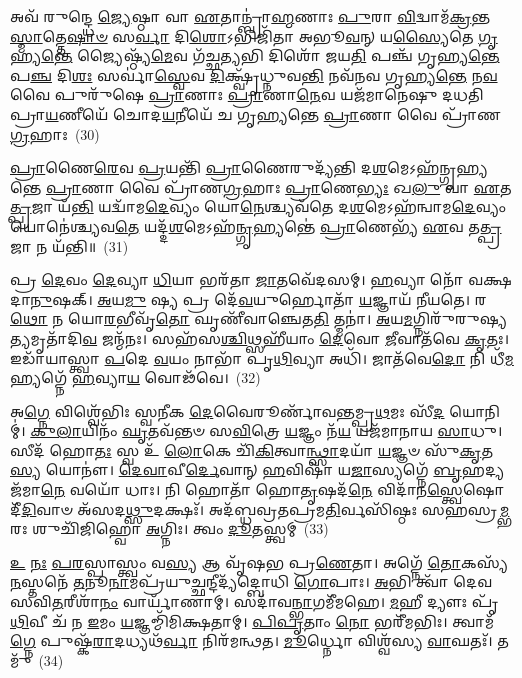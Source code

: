 𑌅𑌵᳴ 𑌰𑍁𑌨𑍍𑌦𑍍𑌧𑍇 \ul{𑌜𑍍𑌯𑍇}\-𑌷𑍍𑌠𑌾 𑌵𑌾 \ul{𑌏}\-𑌤𑌾𑌨𑍍𑌬𑍍𑌰𑌾॑\-\ul{𑌹𑍍𑌮}\-𑌣𑌾𑌃 \ul{𑌪𑍁}\-𑌰𑌾 \ul{𑌵𑌿}\-𑌦𑍍𑌵𑌾𑌮᳴\-\ul{𑌕𑍍𑌰}\-𑌨𑍍𑌤\-\ul{𑌸𑍍𑌮𑌾}\-𑌤𑍍𑌤𑍇\-\ul{𑌷𑌾}\-\-\ul{𑍞} 𑌸\-\ul{𑌰𑍍𑌵𑌾} 𑌦𑌿\-\ul{𑌶𑍋}\-\-𑌽𑌭𑌿𑌜𑌿᳴𑌤𑌾 𑌅𑌭𑍂\-\ul{𑌵}\-𑌨𑍍 𑌯\-\ul{𑌸𑍍𑌯𑍈}\-𑌤𑍇 \ul{𑌗𑍃}\-𑌹𑍍𑌯\-\ul{𑌨𑍍𑌤𑍇} 𑌜𑍍𑌯𑍈𑌷𑍍𑌠𑍍𑌯᳴\-\ul{𑌮𑍇}\-𑌵 𑌗᳴𑌚𑍍𑌛\-\ul{𑌤𑍍𑌯}\-𑌭𑌿 𑌦𑌿𑌶𑍋᳴ 𑌜𑌯\-\ul{𑌤𑌿} 𑌪𑌞𑍍𑌚᳴ 𑌗𑍃𑌹𑍍𑌯\-\ul{𑌨𑍍𑌤𑍇} 𑌪\-\ul{𑌞𑍍𑌚} 𑌦𑌿\-\ul{𑌶𑌃} 𑌸𑌰𑍍𑌵𑌾॑\-\ul{𑌸𑍍𑌵𑍇}\-𑌵 \ul{𑌦𑌿}\-𑌕𑍍𑌷𑍍𑌵𑍃᳴𑌧𑍍𑌨𑍁𑌵\-\ul{𑌨𑍍𑌤𑌿} 𑌨𑌵᳴𑌨𑌵 𑌗𑍃𑌹𑍍𑌯\-\ul{𑌨𑍍𑌤𑍇} 𑌨\-\ul{𑌵} 𑌵𑍈 𑌪𑍁𑌰𑍁᳴𑌷𑍇 \ul{𑌪𑍍𑌰𑌾}\-𑌣𑌾𑌃 \ul{𑌪𑍍𑌰𑌾}\-𑌣𑌾\-\ul{𑌨𑍇}\-𑌵 𑌯𑌜᳴𑌮𑌾𑌨𑍇𑌷𑍁 𑌦𑌧𑌤𑌿 𑌪𑍍𑌰𑌾\-\ul{𑌯}\-𑌣𑍀𑌯𑍇᳴ 𑌚𑍋𑌦\-\ul{𑌯}\-𑌨𑍀𑌯𑍇᳴ 𑌚 𑌗𑍃𑌹𑍍𑌯𑌨𑍍𑌤𑍇 \ul{𑌪𑍍𑌰𑌾}\-𑌣𑌾 𑌵𑍈 𑌪𑍍𑌰𑌾᳴𑌣\-\ul{𑌗𑍍𑌰}\-𑌹𑌾𑌃~(30)

\-\ul{𑌪𑍍𑌰𑌾}\-𑌣𑍈\-\ul{𑌰𑍇}\-𑌵 \ul{𑌪𑍍𑌰}\-𑌯𑌨𑍍𑌤𑌿᳴ \ul{𑌪𑍍𑌰𑌾}\-𑌣𑍈𑌰𑍁𑌦𑍍𑌯᳴𑌨𑍍𑌤𑌿 𑌦\-\ul{𑌶}\-𑌮𑍇\-𑌽𑌹᳴𑌨𑍍𑌗𑍃𑌹𑍍𑌯𑌨𑍍𑌤𑍇 \ul{𑌪𑍍𑌰𑌾}\-𑌣𑌾 𑌵𑍈 𑌪𑍍𑌰𑌾᳴𑌣\-\ul{𑌗𑍍𑌰}\-𑌹𑌾𑌃 \ul{𑌪𑍍𑌰𑌾}\-𑌣𑍇\-\ul{𑌭𑍍𑌯𑌃} 𑌖\-\ul{𑌲𑍁} 𑌵𑌾 \ul{𑌏}\-𑌤\-\ul{𑌤𑍍𑌪𑍍𑌰}\-𑌜𑌾 𑌯᳴\-\ul{𑌨𑍍𑌤𑌿} 𑌯𑌦𑍍𑌵𑌾᳴𑌮\-\ul{𑌦𑍇}\-𑌵𑍍𑌯𑌂 𑌯𑍋\-\ul{𑌨𑍇}\-𑌶𑍍𑌚𑍍𑌯𑌵᳴𑌤𑍇 𑌦\-\ul{𑌶}\-𑌮𑍇\-𑌽𑌹᳴𑌨𑍍𑌵𑌾𑌮\-\ul{𑌦𑍇}\-𑌵𑍍𑌯𑌂 𑌯𑍋𑌨𑍇॑𑌶𑍍𑌚𑍍𑌯𑌵\-\ul{𑌤𑍇} 𑌯𑌦𑍍𑌦᳴\-\ul{𑌶}\-𑌮𑍇\-𑌽𑌹᳴\-\ul{𑌨𑍍𑌗𑍃}\-𑌹𑍍𑌯𑌨𑍍𑌤𑍇॑ \ul{𑌪𑍍𑌰𑌾}\-𑌣𑍇𑌭𑍍𑌯᳴ \ul{𑌏}\-𑌵 𑌤\-\ul{𑌤𑍍𑌪𑍍𑌰}\-𑌜𑌾 𑌨 𑌯᳴𑌨𑍍𑌤𑌿॥~(31)

{\anuvakamend[{𑌤𑌤𑍍𑌪𑍍𑌰𑌾᳴𑌣\-\ul{𑌗𑍍𑌰}\-𑌹𑌾𑌃 \ul{𑌸}\-𑌪𑍍𑌤𑌤𑍍𑌰𑌿𑍞᳴𑌶𑌚𑍍𑌚}]}%

𑌪𑍍𑌰 \ul{𑌦𑍇}\-𑌵𑌂 \ul{𑌦𑍇}\-𑌵𑍍𑌯𑌾 \ul{𑌧𑌿}\-𑌯𑌾 𑌭𑌰᳴𑌤𑌾 \ul{𑌜𑌾}\-𑌤𑌵𑍇᳴𑌦𑌸𑌮𑍍। \ul{𑌹}\-𑌵𑍍𑌯𑌾 𑌨𑍋᳴ 𑌵𑌕𑍍𑌷𑌦𑌾\-\ul{𑌨𑍁}\-𑌷𑌕𑍍। \ul{𑌅}\-𑌯\-\ul{𑌮𑍁} 𑌷𑍍𑌯 𑌪𑍍𑌰 𑌦𑍇᳴\-\ul{𑌵}\-𑌯𑍁𑌰𑍍\mbox{}𑌹𑍋𑌤𑌾᳴ \ul{𑌯}\-𑌜𑍍𑌞𑌾𑌯᳴ 𑌨𑍀𑌯𑌤𑍇। 𑌰\-\ul{𑌥𑍋} 𑌨 𑌯𑍋\-\ul{𑌰}\-𑌭𑍀𑌵𑍃᳴\-\ul{𑌤𑍋} 𑌘𑍃𑌣𑍀᳴𑌵𑌾𑌞𑍍𑌚𑍇𑌤\-\ul{𑌤𑌿} 𑌤𑍍𑌮𑌨𑌾॑। \ul{𑌅}\-𑌯\-\ul{𑌮}\-𑌗𑍍𑌨𑌿𑌰𑍁᳴𑌰𑍁𑌷𑍍𑌯\-\ul{𑌤𑍍𑌯}\-𑌮𑍃𑌤𑌾᳴𑌦𑌿\-\ul{𑌵} 𑌜𑌨𑍍𑌮᳴𑌨𑌃। 𑌸𑌹᳴𑌸\-\ul{𑌶𑍍𑌚𑌿}\-𑌥𑍍𑌸𑌹𑍀᳴𑌯𑌾𑌂 \ul{𑌦𑍇}\-𑌵𑍋 \ul{𑌜𑍀}\-𑌵𑌾𑌤᳴𑌵𑍇 \ul{𑌕𑍃}\-𑌤𑌃। 𑌇𑌡𑌾᳴𑌯𑌾𑌸𑍍𑌤𑍍𑌵𑌾 \ul{𑌪}\-𑌦𑍇 \ul{𑌵}\-𑌯𑌂 𑌨𑌾𑌭𑌾᳴ 𑌪𑍃\-\ul{𑌥𑌿}\-𑌵𑍍𑌯𑌾 𑌅𑌧𑌿᳴। 𑌜𑌾𑌤᳴𑌵𑍇\-\ul{𑌦𑍋} 𑌨𑌿 𑌧𑍀᳴\-\ul{𑌮}\-𑌹𑍍𑌯𑌗𑍍𑌨𑍇᳴ \ul{𑌹}\-𑌵𑍍𑌯𑌾\-\ul{𑌯} 𑌵𑍋𑌢᳴𑌵𑍇।~(32)

𑌅\-\ul{𑌗𑍍𑌨𑍇} 𑌵𑌿𑌶𑍍𑌵𑍇᳴𑌭𑌿𑌃 𑌸𑍍𑌵𑌨𑍀𑌕 \ul{𑌦𑍇}\-𑌵𑍈𑌰𑍂𑌰𑍍𑌣𑌾᳴𑌵𑌨𑍍𑌤𑌮𑍍𑌪𑍍𑌰\-\ul{𑌥}\-𑌮𑌃 𑌸𑍀᳴\-\ul{𑌦} 𑌯𑍋𑌨𑌿𑌮𑍍॑। \ul{𑌕𑍁}\-\-\ul{𑌲𑌾}\-𑌯𑌿𑌨𑌂᳴ \ul{𑌘𑍃}\-𑌤𑌵᳴𑌨𑍍𑌤𑍞 𑌸\-\ul{𑌵𑌿}\-𑌤𑍍𑌰𑍇 \ul{𑌯}\-𑌜𑍍𑌞𑌂 𑌨᳴\-\ul{𑌯} 𑌯𑌜᳴𑌮𑌾𑌨𑌾𑌯 \ul{𑌸𑌾}\-𑌧𑍁। 𑌸𑍀𑌦᳴ 𑌹𑍋\-\ul{𑌤𑌃} 𑌸𑍍𑌵 𑌉᳴ \ul{𑌲𑍋}\-𑌕𑍇 𑌚𑌿᳴\-\ul{𑌕𑌿}\-𑌤𑍍𑌵𑌾\-\ul{𑌨𑍍𑌥𑍍𑌸𑌾}\-𑌦𑌯𑌾᳴ \ul{𑌯}\-𑌜𑍍𑌞𑍞 𑌸𑍁᳴\-\ul{𑌕𑍃}\-𑌤\-\ul{𑌸𑍍𑌯} 𑌯𑍋𑌨𑍗॑। \ul{𑌦𑍇}\-\-\ul{𑌵𑌾}\-𑌵𑍀\-\ul{𑌰𑍍𑌦𑍇}\-𑌵𑌾𑌨𑍍 \ul{𑌹}\-𑌵𑌿𑌷𑌾᳴ 𑌯\-\ul{𑌜𑌾}\-𑌸𑍍𑌯𑌗𑍍𑌨𑍇᳴ \ul{𑌬𑍃}\-𑌹𑌦𑍍𑌯𑌜᳴𑌮𑌾\-\ul{𑌨𑍇} 𑌵𑌯𑍋᳴ 𑌧𑌾𑌃। 𑌨𑌿 𑌹𑍋𑌤𑌾᳴ 𑌹𑍋\-\ul{𑌤𑍃}\-𑌷𑌦᳴\-\ul{𑌨𑍇} 𑌵𑌿𑌦𑌾᳴𑌨\-\ul{𑌸𑍍𑌤𑍍𑌵𑍇}\-𑌷𑍋 𑌦𑍀᳴\-\ul{𑌦𑌿}\-𑌵𑌾𑍞 𑌅᳴𑌸𑌦\-\ul{𑌥𑍍𑌸𑍁}\-𑌦𑌕𑍍𑌷𑌃᳴। 𑌅𑌦᳴𑌬𑍍𑌧𑌵𑍍𑌰𑌤𑌪𑍍𑌰𑌮\-\ul{𑌤𑌿}\-𑌰𑍍𑌵𑌸𑌿᳴𑌷𑍍𑌠𑌃 𑌸𑌹𑌸𑍍𑌰\-\ul{𑌮𑍍𑌭}\-𑌰𑌃 𑌶𑍁𑌚𑌿᳴𑌜𑌿𑌹𑍍𑌵𑍋 \ul{𑌅}\-𑌗𑍍𑌨𑌿𑌃। 𑌤𑍍𑌵𑌂 \ul{𑌦𑍂}\-𑌤𑌸𑍍𑌤𑍍𑌵𑌮𑍍~(33)

\-\ul{𑌉} \ul{𑌨𑌃} \ul{𑌪}\-\-\ul{𑌰}\-𑌸𑍍𑌪𑌾𑌸𑍍𑌤𑍍𑌵𑌂 𑌵\-\ul{𑌸𑍍𑌯} 𑌆 𑌵𑍃᳴𑌷𑌭 𑌪𑍍𑌰\-\ul{𑌣𑍇}\-𑌤𑌾। 𑌅𑌗𑍍𑌨𑍇᳴ \ul{𑌤𑍋}\-𑌕𑌸𑍍𑌯᳴ \ul{𑌨}\-𑌸𑍍𑌤𑌨𑍇᳴ \ul{𑌤}\-𑌨𑍂\-\ul{𑌨𑌾}\-𑌮𑌪𑍍𑌰᳴𑌯𑍁\-\ul{𑌚𑍍𑌛}\-𑌨𑍍𑌦𑍀𑌦𑍍𑌯᳴𑌦𑍍𑌬𑍋𑌧𑌿 \ul{𑌗𑍋}\-𑌪𑌾𑌃। \ul{𑌅}\-𑌭𑌿 𑌤𑍍𑌵𑌾᳴ 𑌦𑍇𑌵 𑌸𑌵𑌿\-\ul{𑌤}\-𑌰𑍀𑌶𑌾᳴\-\ul{𑌨𑌂} 𑌵𑌾𑌰𑍍𑌯𑌾᳴𑌣𑌾𑌮𑍍। 𑌸𑌦𑌾᳴𑌵\-\ul{𑌨𑍍𑌭𑌾}\-𑌗𑌮𑍀᳴𑌮𑌹𑍇। \ul{𑌮}\-𑌹𑍀 𑌦𑍍𑌯𑍗𑌃 𑌪𑍃᳴\-\ul{𑌥𑌿}\-𑌵𑍀 𑌚᳴ 𑌨 \ul{𑌇}\-𑌮𑌂 \ul{𑌯}\-𑌜𑍍𑌞𑌮𑍍𑌮𑌿᳴𑌮𑌿𑌕𑍍𑌷𑌤𑌾𑌮𑍍। \ul{𑌪𑌿}\-\-\ul{𑌪𑍃}\-𑌤𑌾𑌂 \ul{𑌨𑍋} 𑌭𑌰𑍀᳴𑌮𑌭𑌿𑌃। 𑌤𑍍𑌵𑌾𑌮᳴\-\ul{𑌗𑍍𑌨𑍇} 𑌪𑍁𑌷𑍍𑌕᳴\-\ul{𑌰𑌾}\-𑌦𑌧𑍍𑌯𑌥᳴\-\ul{𑌰𑍍𑌵𑌾} 𑌨𑌿𑌰᳴𑌮𑌨𑍍𑌥𑌤। \ul{𑌮𑍂}\-𑌰𑍍𑌧𑍍𑌨𑍋 𑌵𑌿𑌶𑍍𑌵᳴𑌸𑍍𑌯 \ul{𑌵𑌾}\-𑌘𑌤𑌃᳴। 𑌤𑌮𑍁᳴~(34)


